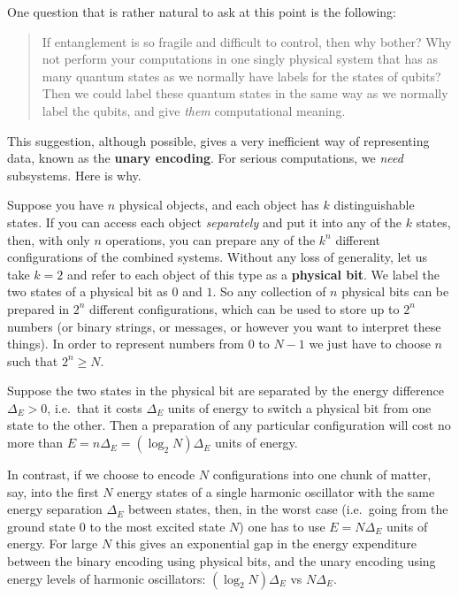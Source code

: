 \documentclass[fleqn,a4paper]{article}
\renewcommand{\footnote}[1]{\sidenotetext[{\color{white}0}\!\!]{\footnotesize #1}}
\theoremstyle{definition}
\theoremstyle{definition}
\theoremstyle{definition}
\theoremstyle{definition}
\theoremstyle{remark}
\begin{document}
One question that is rather natural to ask at this point is the following:

\begin{quote}
If entanglement is so fragile and difficult to control, then why bother?
Why not perform your computations in one singly physical system that has as many quantum states as we normally have labels for the states of qubits?
Then we could label these quantum states in the same way as we normally label the qubits, and give \emph{them} computational meaning.
\end{quote}

This suggestion, although possible, gives a very inefficient way of representing data, known as the \textbf{unary encoding}.
For serious computations, we \emph{need} subsystems.
Here is why.

Suppose you have \(n\) physical objects, and each object has \(k\) distinguishable states.
If you can access each object \emph{separately} and put it into any of the \(k\) states, then, with only \(n\) operations, you can prepare any of the \(k^{n}\) different configurations of the combined systems.
Without any loss of generality, let us take \(k=2\) and refer to each object of this type as a \textbf{physical bit}.
We label the two states of a physical bit as \(0\) and \(1\).
So any collection of \(n\) physical bits can be prepared in \(2^{n}\) different configurations, which can be used to store up to \(2^{n}\) numbers (or binary strings, or messages, or however you want to interpret these things).
In order to represent numbers from \(0\) to \(N-1\) we just have to choose \(n\) such that \(2^n\geqslant N\).

Suppose the two states in the physical bit are separated by the energy difference \(\Delta_E>0\), i.e.~that it costs \(\Delta_E\) units of energy to switch a physical bit from one state to the other.
Then a preparation of any particular configuration will cost no more than \(E=n \Delta_E=(\log_2 N)\Delta_E\) units of energy.\footnote{For simplicity here, we're assuming that \(N=2^n\).}

In contrast, if we choose to encode \(N\) configurations into one chunk of matter, say, into the first \(N\) energy states of a single harmonic oscillator with the same energy separation \(\Delta_E\) between states, then, in the worst case (i.e.~going from the ground state \(0\) to the most excited state \(N\)) one has to use \(E=N\Delta_E\) units of energy.
For large \(N\) this gives an exponential gap in the energy expenditure between the binary encoding using physical bits, and the unary encoding using energy levels of harmonic oscillators: \((\log_2 N)\Delta_E\) vs \(N\Delta_E\).
\end{document}
